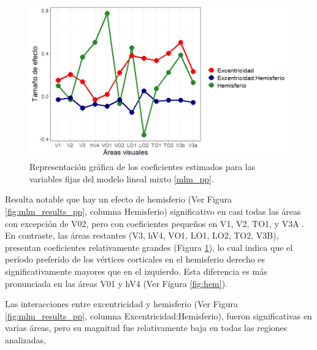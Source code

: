 \begin{figure}[h]
	\centering
	\includegraphics[scale=0.6]{Graphics/effect_size_coef_pp}
	\caption{Representación gráfica de los coeficientes estimados para las variables fijas del modelo lineal mixto \ref{mlm_pp}.}
	\label{fig:coeff}
\end{figure}

Resulta notable que hay un efecto de hemisferio (Ver Figura \ref{fig:mlm_results_pp}, columna Hemisferio) significativo en casi todas las áreas con excepción de V02, pero con coeficientes pequeños en V1, V2, TO1, y V3A . En contraste, las \'areas restantes (V3, hV4, VO1, LO1, LO2, TO2, V3B), presentan coeficientes relativamente grandes (Figura \ref{fig:coeff}), lo cual indica que  el per\'iodo preferido de los v\'ertices corticales en el hemisferio derecho es significativamente mayores que en el izquierdo. Esta diferencia es m\'as pronunciada en las \'areas V01 y hV4 (Ver Figura \ref{fig:hem}). 

Las interacciones entre excentricidad y hemisferio (Ver Figura \ref{fig:mlm_results_pp}, columna Excentricidad:Hemisferio), fueron significativas en varias áreas, pero su magnitud fue relativamente baja en todas las regiones analizadas,

